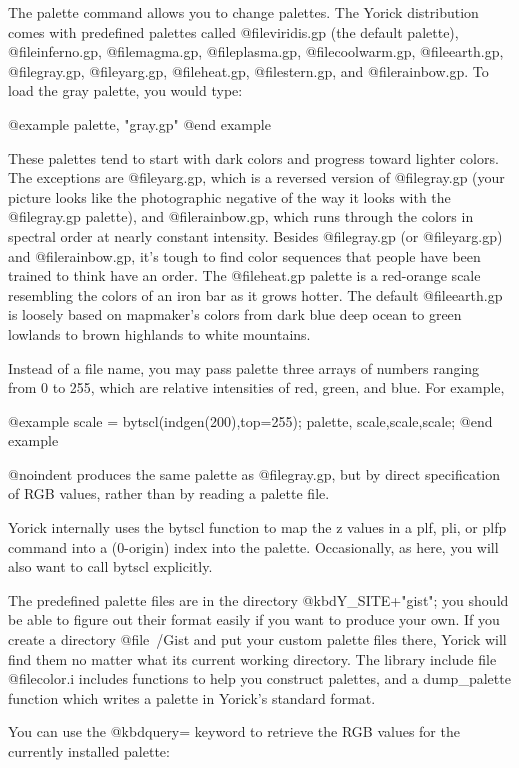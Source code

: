 The palette command allows you to change palettes.  The Yorick
distribution comes with predefined palettes called @file{viridis.gp}
(the default palette), @file{inferno.gp}, @file{magma.gp},
@file{plasma.gp}, @file{coolwarm.gp}, @file{earth.gp}, @file{gray.gp},
@file{yarg.gp}, @file{heat.gp}, @file{stern.gp}, and @file{rainbow.gp}.
To load the gray palette, you would type:

@example
palette, "gray.gp"
@end example

These palettes tend to start with dark colors and progress toward
lighter colors.  The exceptions are @file{yarg.gp}, which is a reversed
version of @file{gray.gp} (your picture looks like the photographic
negative of the way it looks with the @file{gray.gp} palette), and
@file{rainbow.gp}, which runs through the colors in spectral order at
nearly constant intensity.  Besides @file{gray.gp} (or @file{yarg.gp})
and @file{rainbow.gp}, it's tough to find color sequences that people
have been trained to think have an order.  The @file{heat.gp} palette is
a red-orange scale resembling the colors of an iron bar as it grows
hotter.  The default @file{earth.gp} is loosely based on mapmaker's
colors from dark blue deep ocean to green lowlands to brown highlands to
white mountains.

Instead of a file name, you may pass palette three arrays of numbers
ranging from 0 to 255, which are relative intensities of red, green,
and blue.  For example,

@example
scale = bytscl(indgen(200),top=255);
palette, scale,scale,scale;
@end example

@noindent
produces the same palette as @file{gray.gp}, but by direct specification
of RGB values, rather than by reading a palette file.

Yorick internally uses the bytscl function to map the z values in a
plf, pli, or plfp command into a (0-origin) index into the palette.
Occasionally, as here, you will also want to call bytscl explicitly.

The predefined palette files are in the directory @kbd{Y_SITE+"gist"};
you should be able to figure out their format easily if you want to
produce your own.  If you create a directory @file{~/Gist} and put your
custom palette files there, Yorick will find them no matter what its
current working directory.  The library include file @file{color.i}
includes functions to help you construct palettes, and a dump_palette
function which writes a palette in Yorick's standard format.

You can use the @kbd{query=} keyword to retrieve the RGB values for the
currently installed palette:

